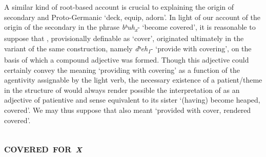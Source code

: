 \documentclass[output=paper,colorlinks,citecolor=brown]{langscibook}
\begin{document}
A similar kind of root-based account is crucial to explaining the origin of secondary  and Proto-Germanic  ‘deck, equip, adorn’. In light of our account of the origin of the secondary  in the  phrase  \textit{bʰuh\textsubscript{x}}- ‘become covered’, it is reasonable to suppose that , provisionally definable as ‘cover’, originated ultimately in the  variant of the same construction, namely  \textit{dʰeh\textsubscript{1}}- ‘provide with covering’, on the basis of which a compound adjective  was formed. Though this adjective could certainly convey the meaning ‘providing with covering’ as a function of the agentivity  assignable by the  light verb, the necessary existence of a patient/theme in the structure of  would always render possible the interpretation of  as an adjective of patientive and  sense equivalent to its sister  ‘(having) become heaped, covered’. We may thus suppose that  also meant ‘provided with cover, rendered covered’.

\subsection{\textsc{covered for \textit{x}}}
\end{document}

